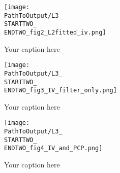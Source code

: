 \begin{appendix}
\begin{figure}[H] %
  \centering
  \texttt{[image: \\PathToOutput/L3\_\\STARTTWO\_\\ENDTWO\_fig2\_L2fitted\_iv.png]}%
  \caption{Your caption here}
  \label{fig:time2lvl3fig2}
\end{figure}


\begin{figure}[H] %
  \centering
  \texttt{[image: \\PathToOutput/L3\_\\STARTTWO\_\\ENDTWO\_fig3\_IV\_filter\_only.png]}%
  \caption{Your caption here}
  \label{fig:time2lvl3fig3}
\end{figure}


\begin{figure}[H] %
  \centering
  \texttt{[image: \\PathToOutput/L3\_\\STARTTWO\_\\ENDTWO\_fig4\_IV\_and\_PCP.png]}%
  \caption{Your caption here}
  \label{fig:time2lvl3fig4}
\end{figure}

\newpage


\end{appendix}


